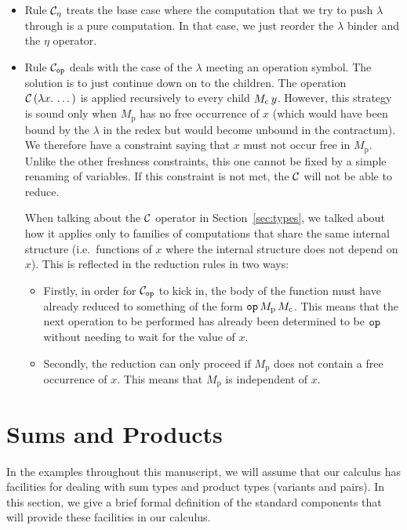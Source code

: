 \begin{itemize}
\item Rule $\mathcal{C}_\eta$ treats the base case where the computation that we
  try to push $\lambda$ through is a pure computation. In that case, we
  just reorder the $\lambda$ binder and the $\eta$ operator.

\item Rule $\mathcal{C}_{\mathtt{op}}$ deals with the case of the $\lambda$ meeting an
  operation symbol. The solution is to just continue down on to the
  children. The operation $\mathcal{C}\,(\lambda x.\, \dots)$ is applied
  recursively to every child $M_{\mathrm{c}}\,y$. However, this
  strategy is sound only when $M_{\mathrm{p}}$ has no free occurrence of
  $x$ (which would have been bound by the $\lambda$ in the redex but would
  become unbound in the contractum). We therefore have a constraint saying
  that $x$ must not occur free in $M_{\mathrm{p}}$. Unlike the other
  freshness constraints, this one cannot be fixed by a simple renaming of
  variables. If this constraint is not met, the $\mathcal{C}$ will not be able to
  reduce.

  When talking about the $\mathcal{C}$ operator in Section~\ref{sec:types}, we
  talked about how it applies only to families of computations that share
  the same internal structure (i.e.\ functions of $x$ where the internal
  structure does not depend on $x$). This is reflected in the reduction
  rules in two ways:
  \begin{itemize}
  \item Firstly, in order for $\mathcal{C}_{\mathtt{op}}$ to kick in, the body of the
    function must have already reduced to something of the form
    $\mathtt{op}\,M_{\mathrm{p}}\,M_{\mathrm{c}}$. This means that
    the next operation to be performed has already been determined to be
    $\mathtt{op}$ without needing to wait for the value of $x$.
  \item Secondly, the reduction can only proceed if $M_{\mathrm{p}}$ does
    not contain a free occurrence of $x$. This means that $M_{\mathrm{p}}$
    is independent of $x$.
  \end{itemize}
\end{itemize}


\section{Sums and Products}
\label{sec:sums-and-products}

In the examples throughout this manuscript, we will assume that our
calculus has facilities for dealing with sum types and product types
(variants and pairs). In this section, we give a brief formal definition of
the standard components that will provide these facilities in our calculus.

